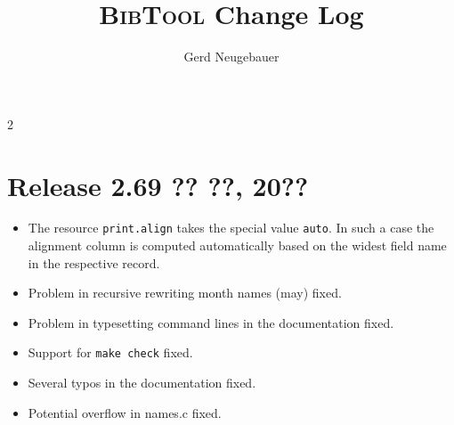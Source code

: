 \documentclass[11pt,a4paper]{scrartcl}
\newenvironment{Developers}{}{}
\newcommand\Developer[3]{}
\newcommand\rsc[1]{\texttt{#1}}
\newcommand\File[1]{\textsf{#1}}
\newcommand\BibTool{\textsc{BibTool}}
\newenvironment{Releases}{\begin{multicols}2\RaggedRight}{\end{multicols}}
\newenvironment{Release}[2]{%
  \def\tmp{#2}%
  \section*{Release #1 \ifx\tmp\empty\else{\normalsize[#2]}\fi}
  \begin{itemize}
}{\end{itemize}}
\newenvironment{Fix}[1]{\item }{}
\newenvironment{New}[1]{\item }{}
\begin{document}

\title{\BibTool{} Change Log}
\author{Gerd Neugebauer}
\date{}
\maketitle

\begin{Developers}
  \Developer{gene}{Gerd Neugebauer}{gene@gerd-neugebauer.de}
\end{Developers}

\begin{Releases}

 \begin{Release}{2.69}{?? ??, 20??}
  \begin{New}{gene}
    The resource \rsc{print.align} takes the special value
    \texttt{auto}. In such a case the alignment column is computed
    automatically based on the widest field name in the respective
    record.
  \end{New}
  \begin{Fix}{gene}
    Problem in recursive rewriting month names (may) fixed.
  \end{Fix}
  \begin{Fix}{gene}
    Problem in typesetting command lines in the documentation fixed.
  \end{Fix}
  \begin{Fix}{gene}
    Support for \verb|make check| fixed.
  \end{Fix}
  \begin{Fix}{gene}
    Several typos in the documentation fixed.
  \end{Fix}
  \begin{Fix}{gene}
    Potential overflow in \File{names.c} fixed.
  \end{Fix}
 \end{Release}


\end{Releases}
\end{document}
